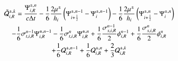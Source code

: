 \begin{multline}
  \tilde{\mathcal{Q}}_{i,R}^{\pm,k}
  = \frac{\Psi_{i,R}^{\pm,n}}{c\Delta t}
  - \frac{1}{6}\frac{2\mu^\pm}{h_i}\left( \Psi_{i+\frac{1}{2}}^{\pm,n-1} - \Psi_i^{\pm,n-1} \right)
  - \frac{1}{6}\frac{2\mu^\pm}{h_i}\left( \Psi_{i+\frac{1}{2}}^{\pm,n}   - \Psi_i^{\pm,n} \right)\\
  - \frac{1}{6}\sigma_{t,i,R}^{n-1}\Psi_{i,R}^{\pm,n-1}
  - \frac{1}{6}\sigma_{t,i,R}^n    \Psi_{i,R}^{\pm,n}
  + \frac{1}{6}\frac{\sigma_{s,i,R}^{n-1}}{2}\phi_{i,R}^{n-1}
  + \frac{1}{6}\frac{\sigma_{s,i,R}^n}{2}    \phi_{i,R}^n\\
  + \frac{1}{6}\mathcal{Q}_{i,R}^{\pm,n-1}
  + \frac{1}{6}\mathcal{Q}_{i,R}^{\pm,n}
  + \frac{2}{3}\mathcal{Q}_{i,R}^{\pm,k}
\end{multline}

